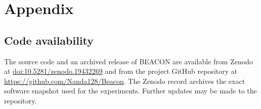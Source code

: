 \section{Appendix}\label{sec:appendix}

\subsection*{Code availability}
The source code and an archived release of BEACON are available from Zenodo at \href{https://doi.org/10.5281/zenodo.19432269}{doi:10.5281/zenodo.19432269} and from the project GitHub repository at \url{https://github.com/Nanda128/Beacon}.
The Zenodo record archives the exact software snapshot used for the experiments.
Further updates may be made to the repository.
